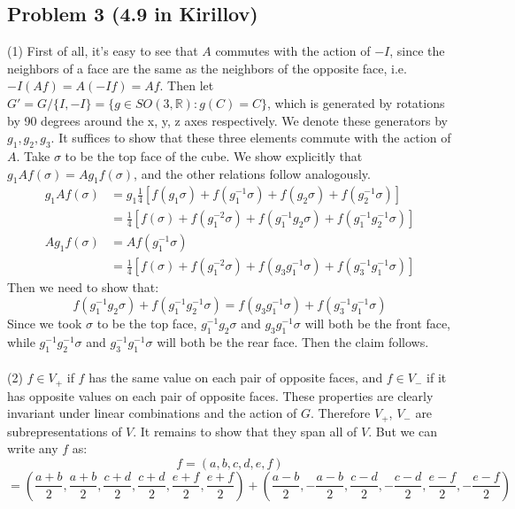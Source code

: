 \documentclass[12 pt]{article}
\newcommand{\R}{\mathbb{R}}
\begin{document}
\subsection*{Problem 3 (4.9 in Kirillov)}
(1) First of all, it's easy to see that $A$ commutes with the action of $-I$, since the neighbors of a face are the same as the neighbors of the opposite face, i.e. $-I  (Af) = A (-I f) = Af$. Then let $G' = G/\{ I, -I\} = \{ g \in SO(3, \R) : g(C) = C \}$, which is generated by rotations by 90 degrees around the x, y, z axes respectively. We denote these generators by $g_1, g_2, g_3$. It suffices to show that these three elements commute with the action of $A$. Take $\sigma$ to be the top face of the cube. We show explicitly that $g_1 A f (\sigma) = A g_1 f(\sigma)$, and the other relations follow analogously.
\begin{align*}
           g_1 A f (\sigma) &= g_1 \frac{1}{4} \left[ f(g_1 \sigma) + f(g_1^{-1} \sigma) + f(g_2 \sigma) + f(g_2^{-1} \sigma) \right]    \\
&= \frac{1}{4}    \left[ f(\sigma) + f(g_1^{-2} \sigma) + f(g_1^{-1} g_2 \sigma) + f(g_1^{-1} g_2^{-1} \sigma)  \right]
\end{align*}
\begin{align*}
          A g_1 f (\sigma) &= A f(g_1^{-1} \sigma)    \\
&= \frac{1}{4}    \left[ f(\sigma) + f(g_1^{-2} \sigma) + f(g_3 g_1^{-1}  \sigma) + f(g_3^{-1} g_1^{-1}  \sigma)  \right]
\end{align*}
Then we need to show that:
\[        f(g_1^{-1} g_2 \sigma) + f(g_1^{-1} g_2^{-1} \sigma) =   f(g_3 g_1^{-1}  \sigma) + f(g_3^{-1} g_1^{-1}  \sigma)    \]
Since we took $\sigma$ to be the top face, $g_1^{-1} g_2 \sigma$ and $g_3 g_1^{-1}  \sigma$ will both be the front face, while $g_1^{-1} g_2^{-1} \sigma$ and $g_3^{-1} g_1^{-1}  \sigma$ will both be the rear face. Then the claim follows.
\\
\\
(2) $f \in V_+$ if $f$ has the same value on each pair of opposite faces, and $f \in V_-$ if it has opposite values on each pair of opposite faces. These properties are clearly invariant under linear combinations and the action of $G$. Therefore $V_+$, $V_-$ are subrepresentations of $V$. It remains to show that they span all of $V$. But we can write any $f$ as:
\[        f = (a,b,c,d,e,f) \]
\[ = \left( \frac{a+b}{2} , \frac{a+b}{2} , \frac{c+d}{2} , \frac{c+d}{2}, \frac{e+f}{2}, \frac{e+f}{2}  \right)  +  \left( \frac{a-b}{2} , - \frac{a-b}{2} , \frac{c-d}{2} ,- \frac{c-d}{2}, \frac{e-f}{2}, -\frac{e-f}{2}  \right)   \]
\end{document}
